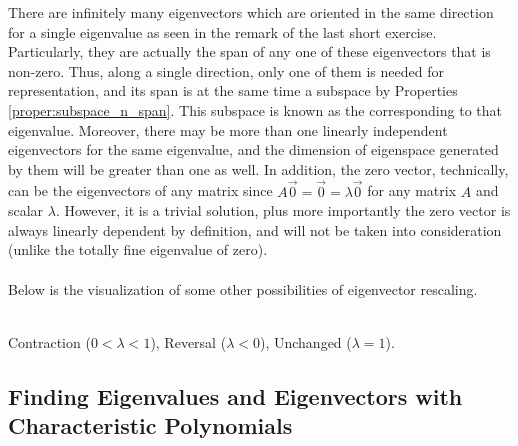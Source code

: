 There are infinitely many eigenvectors which are oriented in the same direction for a single eigenvalue as seen in the remark of the last short exercise. Particularly, they are actually the span of any one of these eigenvectors that is non-zero. Thus, along a single direction, only one of them is needed for representation, and its span is at the same time a subspace by Properties \ref{proper:subspace_n_span}. This subspace is known as the  corresponding to that eigenvalue. Moreover, there may be more than one linearly independent eigenvectors for the same eigenvalue, and the dimension of eigenspace generated by them will be greater than one as well. In addition, the zero vector, technically, can be the eigenvectors of any matrix since $A\vec{0} = \vec{0} = \lambda\vec{0}$ for any matrix $A$ and scalar $\lambda$. However, it is a trivial solution, plus more importantly the zero vector is always linearly dependent by definition, and will not be taken into consideration (unlike the totally fine eigenvalue of zero).\\
\\
Below is the visualization of some other possibilities of eigenvector rescaling.
\begin{center}
\\
Contraction ($0 < \lambda < 1$), Reversal ($\lambda < 0$), Unchanged ($\lambda = 1$).
\end{center}

\subsection{Finding Eigenvalues and Eigenvectors with Characteristic Polynomials}

